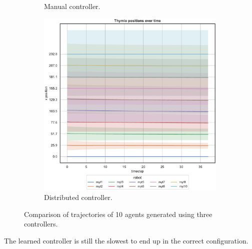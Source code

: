 \begin{figure}[!htb]
\begin{center}
\begin{subfigure}[h]{0.325\textwidth}
		\caption{Manual controller.}
	\end{subfigure}
	\hfill
	\begin{subfigure}[h]{0.325\textwidth}
		\centering
		\includegraphics[width=\textwidth]{contents/images/net-d18/N10/position-overtime-distributed}
		\caption{Distributed controller.}
	\end{subfigure}
\end{center}
	\caption[Evaluation of the trajectories learned by \texttt{net-d18} using 10 
	agents.]{Comparison of trajectories of 10 agents generated using three 
	controllers.}
	\label{fig:net-d18traj10}
\end{figure}

\noindent
The learned controller is still the slowest to end up in the correct 
configuration.

